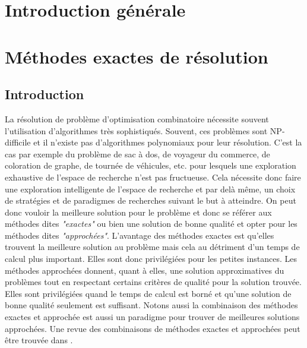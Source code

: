 \documentclass[12pt,a4paper,oneside]{book}
\theoremstyle{definition}
\begin{document}
    \listofalgorithms
    \listoffigures
    \tableofcontents
    \newpage
    \chapter*{Introduction générale}
    
	
	\chapter{Méthodes exactes de résolution}
	\section{Introduction}
	La résolution de problème d'optimisation combinatoire nécessite souvent l'utilisation d'algorithmes très sophistiqués. Souvent, ces problèmes sont NP-difficile et il n'existe pas d'algorithmes polynomiaux pour leur résolution. C'est la cas par exemple du problème de sac à dos, de voyageur du commerce, de coloration de graphe, de tournée de véhicules, etc. pour lesquels une exploration exhaustive de l'espace de recherche n'est pas fructueuse. Cela nécessite donc faire une exploration intelligente de l'espace de recherche et par delà même, un choix de stratégies et de paradigmes de recherches suivant le but à atteindre. On peut donc vouloir la meilleure solution pour le problème et donc se référer aux méthodes dites \textit{"exactes"} ou bien une solution de bonne qualité et opter pour les méthodes dites \textit{"approchées"}. L'avantage des méthodes exactes est qu'elles trouvent la meilleure solution au problème mais cela au détriment d'un temps de calcul plus important. Elles sont donc privilégiées pour les petites instances. Les méthodes approchées donnent, quant à elles, une solution approximatives du problèmes tout en respectant certains critères de qualité pour la solution trouvée. Elles sont privilégiées quand le temps de calcul est borné et qu'une solution de bonne qualité seulement est suffisant. Notons aussi la combinaison des méthodes exactes et approchée est aussi un paradigme pour trouver de meilleures solutions approchées. Une revue des combinaisons de méthodes exactes et approchées peut être trouvée dans \cite{Puchinger2005}. 
\end{document}
